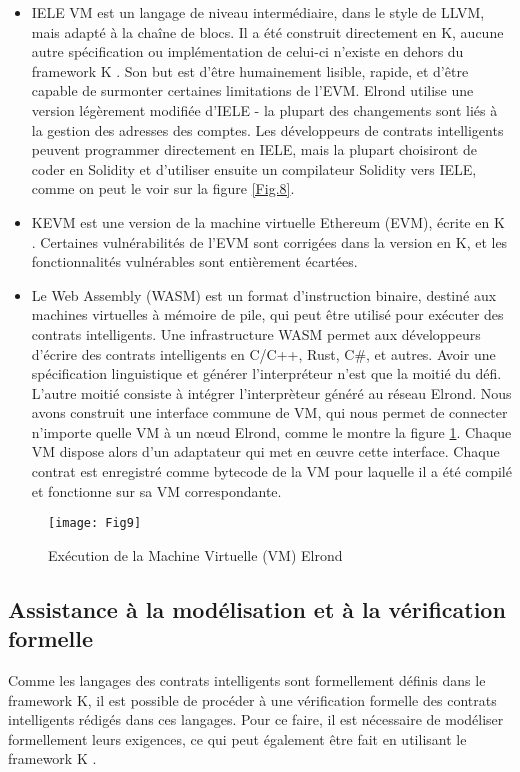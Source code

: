 \documentclass[journal]{IEEEtran}
\begin{document}
\begin{itemize}
  \item IELE VM est un langage de niveau intermédiaire, dans le style de LLVM, mais adapté à la chaîne de blocs. Il a été construit directement en K, aucune autre spécification ou implémentation de celui-ci n'existe en dehors du framework K \cite{40}. Son but est d'être humainement lisible, rapide, et d'être capable de surmonter certaines limitations de l'EVM. Elrond utilise une version légèrement modifiée d'IELE - la plupart des changements sont liés à la gestion des adresses des comptes. Les développeurs de contrats intelligents peuvent programmer directement en IELE, mais la plupart choisiront de coder en Solidity et d'utiliser ensuite un compilateur Solidity vers IELE, comme on peut le voir sur la figure \ref{Fig.8}.  
  \item KEVM est une version de la machine virtuelle Ethereum (EVM), écrite en K \cite{41}. Certaines vulnérabilités de l'EVM sont corrigées dans la version en K, et les fonctionnalités vulnérables sont entièrement écartées.
  \item Le Web Assembly (WASM) est un format d'instruction binaire, destiné aux machines virtuelles à mémoire de pile, qui peut être utilisé pour exécuter des contrats intelligents. Une infrastructure WASM permet aux développeurs d'écrire des contrats intelligents en C/C++, Rust, C\#, et autres.
Avoir une spécification linguistique et générer l'interpréteur n'est que la moitié du défi. L'autre moitié consiste à intégrer l'interprèteur généré au réseau Elrond. Nous avons construit une interface commune de VM, qui nous permet de connecter n'importe quelle VM à un nœud Elrond, comme le montre la figure \ref{Fig.9}. Chaque VM dispose alors d'un adaptateur qui met en œuvre cette interface. Chaque contrat est enregistré comme bytecode de la VM pour laquelle il a été compilé et fonctionne sur sa VM correspondante.
\end{itemize}

\begin{figure}[h]
	\texttt{[image: Fig9]} %
	\caption{Exécution de la Machine Virtuelle (VM) Elrond} %
	\label{Fig.9} %
\end{figure}

\subsection{Assistance à la modélisation et à la vérification formelle}
Comme les langages des contrats intelligents sont formellement définis dans le framework K, il est possible de procéder à une vérification formelle des contrats intelligents rédigés dans ces langages. Pour ce faire, il est nécessaire de modéliser formellement leurs exigences, ce qui peut également être fait en utilisant le framework K \cite{42}.
\end{document}
